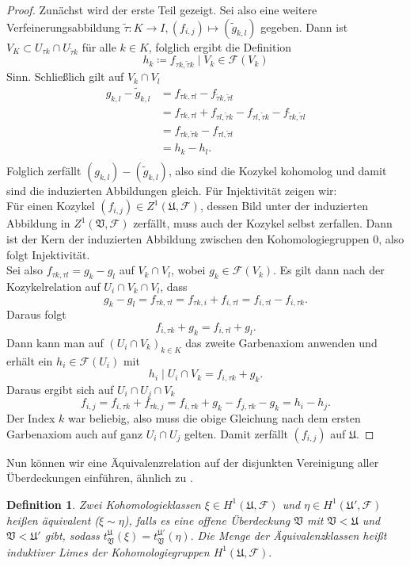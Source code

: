 \documentclass[11pt,a4paper]{scrartcl}
\theoremstyle{thm}
\theoremstyle{def}
\newtheorem{defi}{Definition}[section]
\theoremstyle{remark}
\begin{document}
\begin{proof}
Zunächst wird der erste Teil gezeigt. Sei also eine weitere Verfeinerungsabbildung  $\tilde{\tau}:K\rightarrow I, (f_{i,j})\mapsto (\tilde{g}_{k,l})$ gegeben. Dann ist $V_K\subset U_{\tau k}\cap U_{\tilde{\tau}k}$ für alle $k\in K$, folglich ergibt die Definition 
\[
h_k\coloneqq f_{\tau k,\tilde{\tau} k}\mid V_k\in \mathcal{F}(V_k)
\]
Sinn. Schließlich gilt auf $V_k\cap V_l$
\begin{align*}
g_{k,l}-\tilde{g}_{k,l} & =f_{\tau k,\tau l}-f_{\tilde{\tau}k,\tilde{\tau}l}\\
& =f_{\tau k,\tau l} +f_{\tau l,\tilde{\tau}k}-f_{\tau l,\tilde{\tau}k}-f_{\tilde{
\tau} k,\tilde{\tau}l}\\ 
						& = f_{\tau k, \tilde{\tau}k}-f_{\tau l,\tilde{\tau}l}\\
					& = h_k-h_l.\\
\end{align*}
Folglich zerfällt $(g_{k,l})-(\tilde{g}_ {k,l})$, also sind die Kozykel kohomolog und damit sind die induzierten Abbildungen gleich.
Für Injektivität zeigen wir:\\
Für einen Kozykel $(f_{i,j})\in Z^1(\mathfrak{U},\mathcal{F})$, dessen Bild unter der induzierten Abbildung in $Z^1(\mathfrak{V},\mathcal{F})$ zerfällt, muss auch der Kozykel selbst zerfallen.  Dann ist der Kern der induzierten Abbildung zwischen den Kohomologiegruppen $0$, also folgt Injektivität.\\
Sei also $f_{\tau k,\tau l}=g_k-g_l$ auf $V_k\cap V_l$, wobei $g_k\in \mathcal{F}(V_k)$. Es gilt dann nach der Kozykelrelation auf $U_i\cap V_k\cap V_l$, dass
\[
g_k-g_l= f_{\tau k,\tau l}=f_{\tau k,i}+f_{i,\tau l}=f_{i,\tau l}-f_{i,\tau k}.
\]
Daraus folgt
\[
f_{i,\tau k}+g_k = f_{i,\tau l}+g_l.
\]
Dann kann man auf $(U_i\cap V_k)_{k\in K}$ das zweite Garbenaxiom anwenden und erhält  ein $h_i\in \mathcal{F}(U_i)$ mit
\[
h_i\mid U_i\cap V_k = f_{i,\tau k}+g_k.
\]
Daraus ergibt sich auf $U_i\cap U_j\cap V_k$ 
\[
f_{i,j} = f_{i,\tau k}+f_{\tau k,j} = f_{i,\tau k}+g_k-f_{j,\tau k}-g_k=h_i-h_j.
\]
Der Index $k$ war beliebig, also muss die obige Gleichung nach dem ersten Garbenaxiom auch auf ganz $U_i\cap U_j$ gelten. Damit zerfällt $(f_{i,j})$ auf $\mathfrak{U}$.
\end{proof}
Nun können wir eine Äquivalenzrelation auf der disjunkten Vereinigung aller Überdeckungen einführen, ähnlich zu .
\begin{defi}
	Zwei Kohomologieklassen $\xi\in H^1(\mathfrak{U},\mathcal{F})$ und $\eta\in H^1(\mathfrak{U'},\mathcal{F})$ heißen äquivalent ($\xi\sim\eta$), falls es eine offene Überdeckung $\mathfrak{V}$ mit $\mathfrak{V}<\mathfrak{U}$ und $\mathfrak{V}< \mathfrak{U'}$ gibt, sodass $t^{\mathfrak{U}}_{\mathfrak{V}}(\xi)=t^{\mathfrak{U'}}_{\mathfrak{V}}(\eta).$
	Die Menge der Äquivalenzklassen heißt \emph{induktiver Limes} der Kohomologiegruppen $H^1(\mathfrak{U},\mathcal{F}).$
\end{defi}
\end{document}
